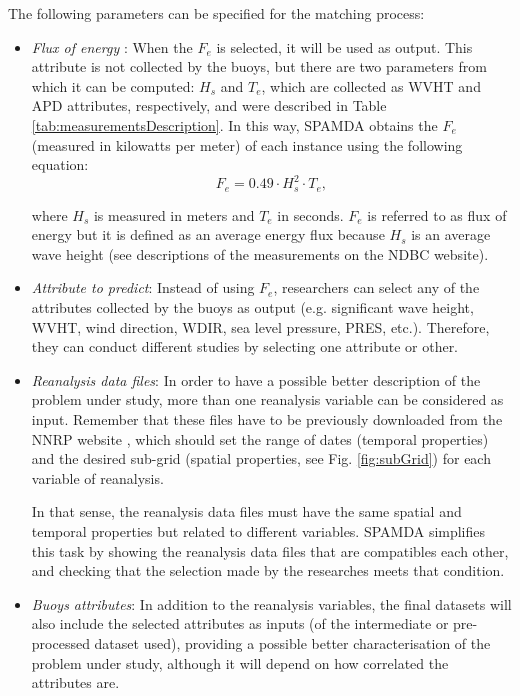 \documentclass[energies,article,submit,moreauthors,pdftex]{Definitions/mdpi}
\begin{document}
				The following parameters can be specified for the matching process:
				\begin{itemize}
				
					\item \textit{Flux of energy} \cite{FERNANDEZ201544}: When the $F_e$ is selected, it will be used as output. This attribute is not collected by the buoys, but there are two parameters from which it can be computed: $H_s$ and $T_e$, which are collected as WVHT and APD attributes, respectively, and were described in Table \ref{tab:measurementsDescription}. In this way, SPAMDA obtains the $F_e$ (measured in kilowatts per meter) of each instance using the following equation:
					\begin{equation}
							F_e = 0.49 \cdot H^2_s \cdot T_e,
							\label{eq:fluxOfEnergy}
					\end{equation}
						
					where $H_s$ is measured in meters and $T_e$ in seconds. $F_e$ is referred to as flux of energy but it is defined as an average energy flux because $H_s$ is an average wave height (see descriptions of the measurements on the NDBC website).
					
					\item \textit{Attribute to predict}: Instead of using $F_e$, researchers can select any of the attributes collected by the buoys as output (e.g. significant wave height, WVHT, wind direction, WDIR, sea level pressure, PRES, etc.). Therefore, they can conduct different studies by selecting one attribute or other.

					\item \textit{Reanalysis data files}: In order to have a possible better description of the problem under study, more than one reanalysis variable can be considered as input. Remember that these files have to be previously downloaded from the NNRP website \cite{NNRP}, which should set the range of dates (temporal properties) and the desired sub-grid (spatial properties, see Fig. \ref{fig:subGrid}) for each variable of reanalysis.
					
					In that sense, the reanalysis data files must have the same spatial and temporal properties but related to different variables. SPAMDA simplifies this task by showing the reanalysis data files that are compatibles each other, and checking that the selection made by the researches meets that condition.
					
					\item \textit{Buoys attributes}: In addition to the reanalysis variables, the final datasets will also include the selected attributes as inputs (of the intermediate or pre-processed dataset used), providing a possible better characterisation of the problem under study, although it will depend on how correlated the attributes are.


\end{itemize}
\end{document}
